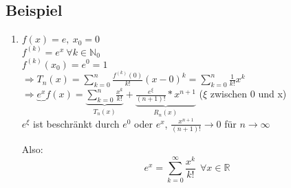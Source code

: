 \subsection{Beispiel}
\begin{enumerate}
	\item
	$f(x)=e, \ x_0=0$\\
	$f^{(k)}=e^x \ \forall k\in \mathbb{N}_0$\\
	$f^{(k)}(x_0)=e^0=1$\\
	$\Rightarrow T_n(x)=\sum_{k=0}^n \frac{f^{(k)}(0)}{k!}(x-0)^k = \sum_{k=0}^n \frac{1}{k!}x^k$\\
	$\Rightarrow \underbrace{e^x}{f(x)}=\underbrace{\sum_{k=0}^n \frac{x^k}{k!}}_{T_n(x)}+\underbrace{\frac{e^\xi}{(n+1)!}*x^{n+1}}_{R_n(x)}$ ($\xi$ zwischen 0 und x)\\
	$e^\xi$ ist beschränkt durch $e^0$ oder $e^x$, $\frac{x^{n+1}}{(n+1)!}\rightarrow 0$ für $n\rightarrow \infty$
	
	Also:\\
	\[e^x=\sum_{k=0}^\infty \frac{x^k}{k!} \ \ \forall x\in\mathbb{R}\]
\end{enumerate}
